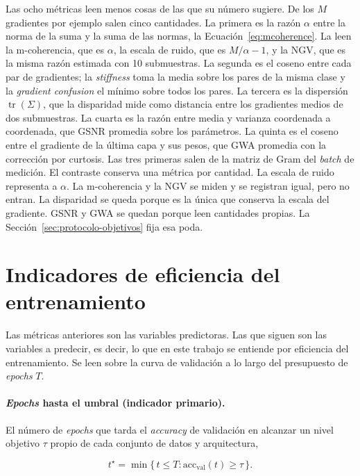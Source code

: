 Las ocho métricas leen menos cosas de las que su número sugiere. De los $M$ gradientes por ejemplo salen cinco cantidades. La primera es la razón $\alpha$ entre la norma de la suma y la suma de las normas, la Ecuación~\ref{eq:mcoherence}. La leen la m-coherencia, que es $\alpha$, la escala de ruido, que es $M/\alpha - 1$, y la NGV, que es la misma razón estimada con 10 submuestras. La segunda es el coseno entre cada par de gradientes; la \emph{stiffness} toma la media sobre los pares de la misma clase y la \emph{gradient confusion} el mínimo sobre todos los pares. La tercera es la dispersión $\operatorname{tr}(\Sigma)$, que la disparidad mide como distancia entre los gradientes medios de dos submuestras. La cuarta es la razón entre media y varianza coordenada a coordenada, que GSNR promedia sobre los parámetros. La quinta es el coseno entre el gradiente de la última capa y sus pesos, que GWA promedia con la corrección por curtosis. Las tres primeras salen de la matriz de Gram del \emph{batch} de medición. El contraste conserva una métrica por cantidad. La escala de ruido representa a $\alpha$. La m-coherencia y la NGV se miden y se registran igual, pero no entran. La disparidad se queda porque es la única que conserva la escala del gradiente. GSNR y GWA se quedan porque leen cantidades propias. La Sección~\ref{sec:protocolo-objetivos} fija esa poda.

\section{Indicadores de eficiencia del entrenamiento}
\label{sec:eficiencia}

Las métricas anteriores son las variables predictoras. Las que siguen son las variables a predecir, es decir, lo que en este trabajo se entiende por eficiencia del entrenamiento. Se leen sobre la curva de validación a lo largo del presupuesto de \emph{epochs} $T$.

\paragraph{\emph{Epochs} hasta el umbral (indicador primario).} El número de \emph{epochs} que tarda
el \emph{accuracy} de validación en alcanzar un nivel objetivo $\tau$ propio de cada conjunto de datos y arquitectura,

\begin{equation}
t^\star = \min\{\, t \le T : \mathrm{acc}_{\text{val}}(t) \ge \tau \,\}.
\label{eq:epochs-to-threshold}
\end{equation}

